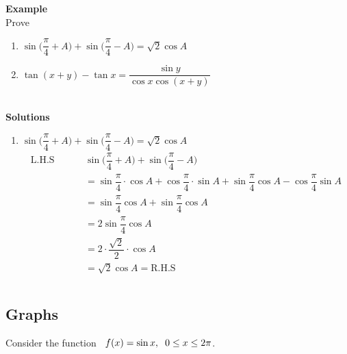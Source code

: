 \documentclass[11pt,a4paper]{article}
\begin{document}
\textbf{Example}\\
Prove
\begin{enumerate}
\item[i.] $\sin \Big(\dfrac{\pi}{4} + A\Big) + \sin \Big( \dfrac{\pi}{4} - A\Big)  = \sqrt{2}\cos A$\\

\item[ii.] $\tan (x + y)  - \tan x = \dfrac{\sin y }{\cos x \cos (x + y)}$\\\\
\end{enumerate}






\textbf{Solutions}
\begin{enumerate}
\item[i.]$\sin \Big(\dfrac{\pi}{4} + A\Big) + \sin \Big( \dfrac{\pi}{4} - A\Big)  = \sqrt{2}\cos A$
\begin{align*}
\text{L.H.S}\hspace{1cm} & \sin \Big(\dfrac{\pi}{4} + A\Big) + \sin \Big( \dfrac{\pi}{4} - A\Big)\\  
& = \sin \dfrac{\pi}{4}\cdot \cos A + \cos \dfrac{\pi}{4}\cdot\sin A + \sin \dfrac{\pi}{4} \cos A - \cos \dfrac{\pi}{4} \sin A \\
& = \sin \dfrac{\pi}{4}\cos A + \sin \dfrac{\pi}{4}\cos A\\
& = 2\sin \dfrac{\pi}{4}\cos A\\
& = 2\cdot \dfrac{\sqrt{2}}{2}\cdot \cos A\\
& = \sqrt{2}\cos A = \text{R.H.S}\\\\
\end{align*}
\end{enumerate}















\subsection{Graphs}
Consider the function $\hspace{0.2cm} f(x) = \sin x , \hspace{0.2cm} 0 \leq x \leq 2\pi$.\\
\end{document}
